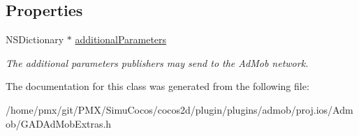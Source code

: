 \subsection*{Properties}
\begin{DoxyCompactItemize}
\item 
\mbox{\label{interfaceGADAdMobExtras_ae48b618b2f77ee469785463e501610af}} 
N\+S\+Dictionary $\ast$ \hyperlink{interfaceGADAdMobExtras_ae48b618b2f77ee469785463e501610af}{additional\+Parameters}
\begin{DoxyCompactList}\small\item\em The additional parameters publishers may send to the Ad\+Mob network. \end{DoxyCompactList}\end{DoxyCompactItemize}


The documentation for this class was generated from the following file\+:\begin{DoxyCompactItemize}
\item 
/home/pmx/git/\+P\+M\+X/\+Simu\+Cocos/cocos2d/plugin/plugins/admob/proj.\+ios/\+Admob/G\+A\+D\+Ad\+Mob\+Extras.\+h\end{DoxyCompactItemize}
